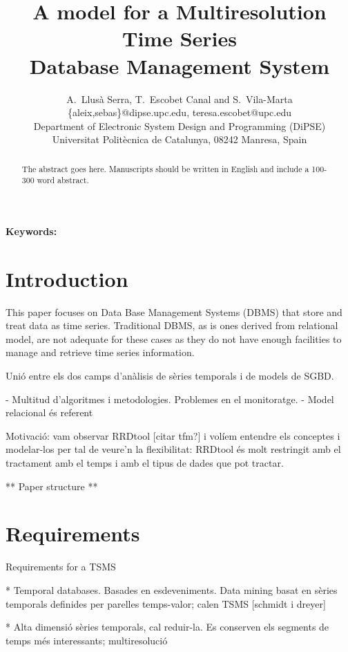 \documentclass{scrartcl}
\title{
  A model for a Multiresolution Time Series\\
  Database Management System }
\author
{
  {
    A.\ Llusà Serra,
    T.\ Escobet Canal
    and S.\ Vila-Marta
  }\\
  {\{aleix,sebas\}@dipse.upc.edu, teresa.escobet@upc.edu}\\
  {Department of Electronic System Design and Programming (DiPSE)}\\
  {Universitat Politècnica de Catalunya, 08242 Manresa, Spain}
}
\begin{document}
\maketitle


\begin{abstract}
The abstract goes here.
Manuscripts should be written in English and include a 100-300 word abstract.
\end{abstract}

{\bfseries Keywords:} 



\twocolumn



\section{Introduction}

This paper focuses on Data Base Management Systems (DBMS) that store
and treat data as time series. Traditional DBMS, as is ones derived
from relational model, are not adequate for these cases as they do not
have enough facilities to manage and retrieve time series
information.



Unió entre els dos camps d'anàlisis de sèries temporals i de models de SGBD. 

- Multitud d'algoritmes i metodologies. Problemes en el monitoratge.
- Model relacional és referent




Motivació: vam observar RRDtool [citar tfm?] i volíem entendre els conceptes i modelar-los per tal de veure'n la flexibilitat: RRDtool és molt restringit amb el tractament amb el temps i amb el tipus de dades que pot tractar.



** Paper structure **



\section{Requirements}

Requirements for a TSMS


* Temporal databases. Basades en esdeveniments. Data mining basat en sèries temporals definides per parelles temps-valor; calen TSMS [schmidt i dreyer] 

* Alta dimensió sèries temporals, cal reduir-la. Es conserven els segments de temps més interessants; multiresolució
\end{document}
